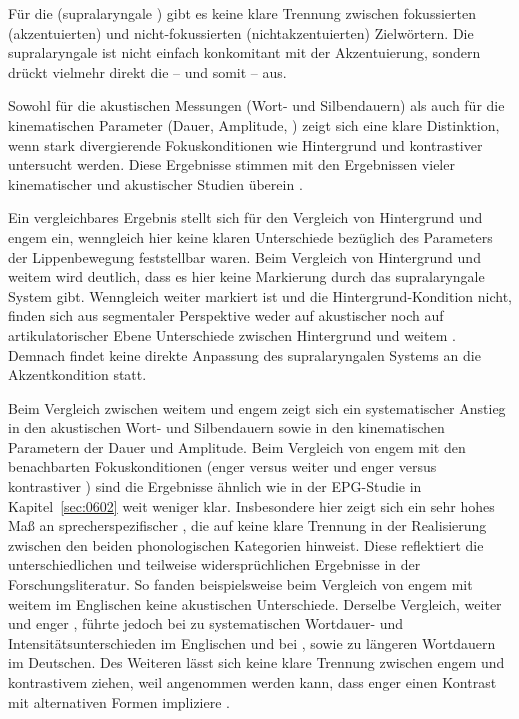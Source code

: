 Für die  (supralaryngale ) gibt es keine klare Trennung zwischen fokussierten (akzentuierten) und nicht-fokussierten (nichtakzentuierten) Zielwörtern. Die supralaryngale  ist nicht einfach konkomitant mit der Akzentuierung, sondern drückt vielmehr direkt die  -- und somit  -- aus.

Sowohl für die akustischen Messungen (Wort- und Silbendauern) als auch für die kinematischen Parameter (Dauer, Amplitude, ) zeigt sich eine klare Distinktion, wenn stark divergierende Fokuskonditionen wie Hintergrund und kontrastiver  untersucht werden. Diese Ergebnisse stimmen mit den Ergebnissen vieler kinematischer und akustischer Studien überein \citep[u.a.][]{Beckman1992, DeJong1993, DeJong1995, Harrington1995, Harrington2000, Cho2005a, Cho2006, Dohen2005, Dohen2006, Baumann2006, Avesani2007, Hermes2008a, Kügler2008}.

Ein vergleichbares Ergebnis stellt sich für den Vergleich von Hintergrund und engem  ein, wenngleich hier keine klaren Unterschiede bezüglich des Parameters  der Lippenbewegung feststellbar waren. Beim Vergleich von Hintergrund und weitem  wird deutlich, dass es hier keine Markierung durch das supralaryngale System gibt. Wenngleich weiter   markiert ist und die Hintergrund-Kondition nicht, finden sich aus segmentaler Perspektive weder auf akustischer noch auf artikulatorischer Ebene Unterschiede zwischen Hintergrund und weitem . Demnach findet keine direkte Anpassung des supralaryngalen Systems an die Akzentkondition statt.

Beim Vergleich zwischen weitem und engem  zeigt sich ein systematischer Anstieg in den akustischen Wort- und Silbendauern sowie in den kinematischen Parametern der  Dauer und Amplitude. Beim Vergleich von engem  mit den benachbarten Fokuskonditionen (enger versus weiter  und enger versus kontrastiver ) sind die Ergebnisse ähnlich wie in der EPG-Studie in Kapitel~\ref{sec:0602} weit weniger klar. Insbesondere hier zeigt sich ein sehr hohes Maß an sprecherspezifischer , die auf keine klare Trennung in der Realisierung zwischen den beiden phonologischen Kategorien hinweist. Diese  reflektiert die unterschiedlichen und teilweise widersprüchlichen Ergebnisse in der Forschungsliteratur. So fanden beispielsweise \citet{Eady1986} beim Vergleich von engem  mit weitem  im Englischen keine akustischen Unterschiede. Derselbe Vergleich, weiter und enger , führte jedoch bei \citet{Breen2010} zu systematischen Wortdauer- und Intensitätsunterschieden im Englischen und bei \citealt{Fery2008,Kügler2008}, sowie \citet{Baumann2006} zu längeren Wortdauern im Deutschen. Des Weiteren lässt sich keine klare Trennung zwischen engem und kontrastivem  ziehen, weil angenommen werden kann, dass enger  einen Kontrast mit alternativen Formen impliziere \citep{Krifka2008}.

